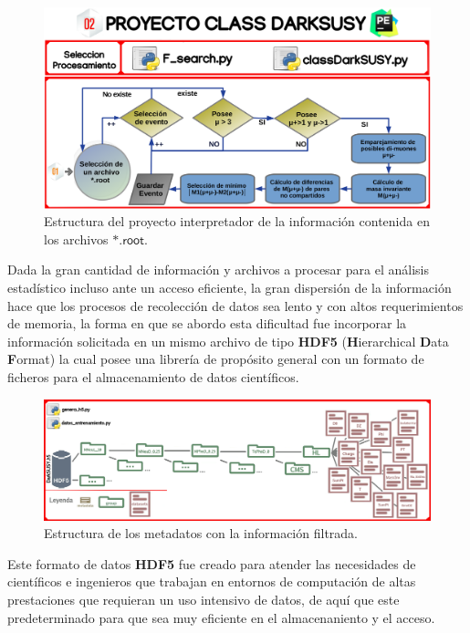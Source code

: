 \begin{figure}[!h]
\centering
\includegraphics[width=1\textwidth]{Simulacion/imagenes/class_darksusy.png}
\caption[Estructura del proyecto interpretador de la información contenida en los archivos $\textsf{*.root}$.]{Estructura del proyecto interpretador de la información contenida en los archivos $\textsf{*.root}$\footnotemark. }
\label{class_darksusy1}
\end{figure}
Dada la gran cantidad de información y archivos a procesar para el análisis estadístico incluso ante un acceso eficiente, la gran dispersión de la información hace que los procesos de recolección de datos sea lento y con altos requerimientos de memoria, la forma en que se abordo esta dificultad fue incorporar la información solicitada en un mismo archivo de tipo \textbf{HDF5} (\textbf{H}ierarchical \textbf{D}ata \textbf{F}ormat) la cual posee una librería de propósito general con un formato de ficheros para el almacenamiento de datos científicos. 
\begin{figure}[!h]
\centering
\includegraphics[width=1\textwidth]{Simulacion/imagenes/class_darksusy3.png}
\caption[Estructura de los metadatos con la información filtrada.]{Estructura de los metadatos con la información filtrada\footnotemark.}
\label{class_darksusy2}
\end{figure}


Este formato de datos \textbf{HDF5} fue creado para atender las necesidades de científicos e ingenieros que trabajan en entornos de computación de altas prestaciones que requieran un uso intensivo de datos, de aquí que este predeterminado para que sea muy eficiente en el almacenaniento y el acceso. 